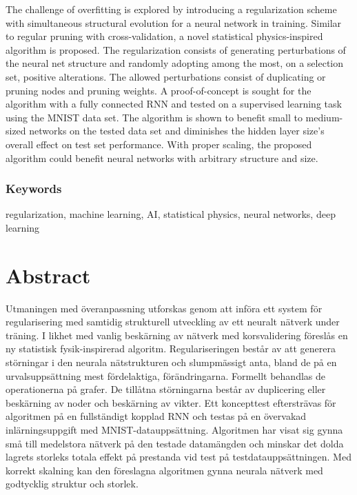 The challenge of overfitting is explored by introducing a regularization scheme with simultaneous structural evolution for a neural network in training. Similar to regular pruning with cross-validation, a novel statistical physics-inspired algorithm is proposed. The regularization consists of generating perturbations of the neural net structure and randomly adopting among the most, on a selection set, positive alterations. The allowed perturbations consist of duplicating or pruning nodes and pruning weights. A proof-of-concept is sought for the algorithm with a fully connected RNN and tested on a supervised learning task using the MNIST data set. The algorithm is shown to benefit small to medium-sized networks on the tested data set and diminishes the hidden layer size's overall effect on test set performance. With proper scaling, the proposed algorithm could benefit neural networks with arbitrary structure and size.


\subsection*{Keywords}
regularization, machine learning, AI, statistical physics, neural networks, deep learning


\newpage
\thispagestyle{plain}
\chapter*{Abstract}
Utmaningen med överanpassning utforskas genom att införa ett system för regularisering med samtidig strukturell utveckling av ett neuralt nätverk under träning. I likhet med vanlig beskärning av nätverk med korsvalidering föreslås en ny statistisk fysik-inspirerad algoritm. Regulariseringen består av att generera störningar i den neurala nätstrukturen och slumpmässigt anta, bland de på en urvalsuppsättning mest fördelaktiga, förändringarna. Formellt behandlas de operationerna på grafer. De tillåtna störningarna består av duplicering eller beskärning av noder och beskärning av vikter. Ett koncepttest eftersträvas för algoritmen på en fullständigt kopplad RNN och testas på en övervakad inlärningsuppgift med MNIST-datauppsättning. Algoritmen har visat sig gynna små till medelstora nätverk på den testade datamängden och minskar det dolda lagrets storleks totala effekt på prestanda vid test på testdatauppsättningen. Med korrekt skalning kan den föreslagna algoritmen gynna neurala nätverk med godtycklig struktur och storlek.

